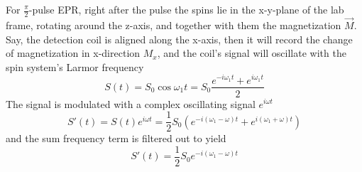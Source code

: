\documentclass[11.5pt,a4paper]{article}
\begin{document}
For $\tfrac{\pi}{2}$-pulse EPR, right after the pulse the spins lie in the x-y-plane of the lab frame, rotating around the z-axis, and together with them the magnetization $\vec{M}$. Say, the detection coil is aligned along the x-axis, then it will record the change of magnetization in x-direction $M_x$, and the coil's signal will oscillate with the spin system's Larmor frequency
\begin{equation}
 S(t) = S_0 \cos \omega_1 t = S_0  \frac{e^{-i \omega_1 t} + e^{i \omega_1 t}}{2}
\end{equation}
The signal is modulated with a complex oscillating signal $e^{i\omega t}$
\begin{equation}
 S'(t) = S(t) e^{i\omega t} = \frac{1}{2} S_0 \left( e^{-i (\omega_1-\omega) t} + e^{i (\omega_1+\omega) t} \right)
\end{equation}
and the sum frequency term is filtered out to yield
\begin{equation}
 S'(t) =\frac{1}{2} S_0 e^{-i (\omega_1-\omega) t}
\end{equation}
\end{document}
